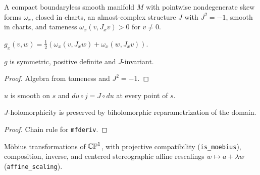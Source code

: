 \begin{definition}
\label{def_target}
\leanok
A compact boundaryless smooth manifold $M$ with pointwise nondegenerate skew forms $\omega_x$,
closed in charts, an almost-complex structure $J$ with $J^2=-1$, smooth in charts, and tameness
$\omega_x(v,J_xv)>0$ for $v\ne0$.
\end{definition}

\begin{definition}
\label{def_metric}
\leanok
{}
$g_x(v,w)=\tfrac12(\omega_x(v,J_xw)+\omega_x(w,J_xv))$.
\end{definition}

\begin{lemma}
\label{lem_metric}
\leanok
{}
$g$ is symmetric, positive definite and $J$-invariant.
\end{lemma}
\begin{proof}\leanok Algebra from tameness and $J^2=-1$.\end{proof}

\begin{definition}
\label{def_jhol}
\leanok
{}
$u$ is smooth on $s$ and $du\circ j=J\circ du$ at every point of $s$.
\end{definition}

\begin{lemma}
\label{lem_jhol_invariance}
\leanok
{}
$J$-holomorphicity is preserved by biholomorphic reparametrization of the domain.
\end{lemma}
\begin{proof}\leanok Chain rule for \texttt{mfderiv}.\end{proof}

\begin{definition}
\label{def_moebius}
\leanok
M\"obius transformations of $\mathbb{CP}^1$, with projective compatibility (\texttt{is\_moebius}), composition,
inverse, and centered stereographic affine rescalings $w\mapsto a+\lambda w$ (\texttt{affine\_scaling}).
\end{definition}


